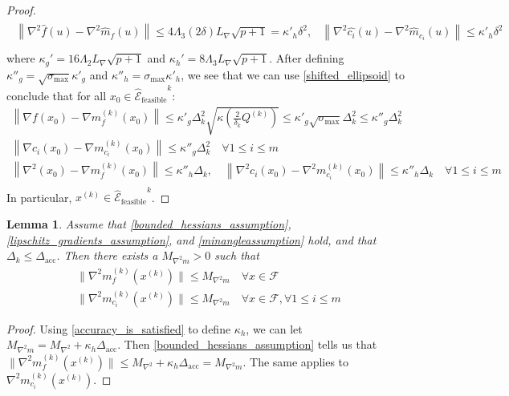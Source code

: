 \documentclass{article}
\newtheorem{lemma}[theorem]{Lemma}
\theoremstyle{case}
\newcommand{\lipgrad}{{L_{\nabla}}}
\newcommand{\maxhessian}{{M_{\nabla^2}}}
\newcommand{\maxmodelhessian}{{M_{\nabla^2 m}}}
\newcommand{\dacc}{{\Delta_{\text{acc}}}}
\newcommand{\xk}{{x^{(k)}}}
\newcommand{\dk}{\Delta_k}
\newcommand{\sdk}{{\delta_k}}
\newcommand{\feasible}{{\mathcal F}}
\newcommand{\hk}{{\nabla^2m_f^{(k)}(x^{(k)})}}
\newcommand{\gradf}{\nabla f}
\newcommand{\scaledunshiftedellipsoid}{{{\mathcal {\hat E}_{\text{feasible}}}^k}}
\newcommand{\sigmamax}{{\sigma_{\text{max}}}}
\begin{document}
\begin{proof}
\begin{align*}
\begin{array}{cc}
\left\|\nabla^2 \hat {f}\left(u\right) - \nabla^2 \hat{m}_f\left(u\right) \right\|\le 4 \Lambda_3 \left(2\delta\right) \lipgrad \sqrt{p+1} = {\kappa'}_h\delta^2, &
\left\|\nabla^2 \hat {c_i}\left(u\right) - \nabla^2 \hat{m}_{c_i}\left(u\right) \right\|\le {\kappa'}_h\delta^2 \\
\end{array}
\end{align*}
where $\kappa_{g}' = 16 \Lambda_2 \lipgrad \sqrt{p+1}$ and $\kappa_{h}' = 8 \Lambda_3 \lipgrad\sqrt{p+1}$.
After defining $\kappa''_{g} =  \sqrt{\sigmamax}\kappa'_g$ and $\kappa''_h = \sigmamax\kappa'_h$, we see that
we can use  \cref{shifted_ellipsoid} to conclude that for all $x_0 \in \scaledunshiftedellipsoid$:
\begin{align*}
\left\|\gradf\left(x_0 \right) - \nabla m^{(k)}_f\left(x_0\right)\right\| \le 
\kappa'_g  \dk^2 \sqrt{\kappa\left(\frac 2 {\sdk} Q^{(k)}\right)} \le \kappa'_g \sqrt{\sigmamax}\dk^2 \le \kappa''_g\dk^2 \\
\left\|\nabla {c_i}\left(x_0 \right) - \nabla m^{(k)}_{c_i}\left(x_0\right)\right\| \le \kappa''_g\dk^2 \quad \forall 1 \le i \le m \\
\left\|\nabla^2\left(x_0 \right) - \nabla m^{(k)}_f\left(x_0\right)\right\| \le \kappa''_h\dk, \quad
\left\|\nabla^2 {c_i}\left(x_0 \right) - \nabla^2 m^{(k)}_{c_i}\left(x_0\right)\right\| \le \kappa''_h\dk \quad \forall 1 \le i \le m \\
\end{align*}
In particular, $\xk \in \scaledunshiftedellipsoid$.
\end{proof}



\begin{lemma}
\label{bounded_model_hessian_lemma}
Assume that \cref{bounded_hessians_assumption}, \cref{lipschitz_gradients_assumption}, and \cref{minangleassumption} hold, and that $\dk \le \dacc$.
Then there exists a $\maxmodelhessian > 0$ such that 
\begin{align*}
\| \hk \| \le \maxmodelhessian \quad \forall x \in \feasible \\
\|\nabla^2 m_{c_i}^{(k)}(\xk) \| \le \maxmodelhessian \quad \forall x \in \feasible, \forall 1 \le i \le m
\end{align*}
\end{lemma}

\begin{proof}
Using \cref{accuracy_is_satisfied} to define $\kappa_h$, we can let $\maxmodelhessian = \maxhessian + \kappa_h \dacc$.
Then \cref{bounded_hessians_assumption} tells us that $\|\hk\| \le \maxhessian + \kappa_h\dacc = \maxmodelhessian$.
The same applies to $\nabla^2 m_{c_i}^{(k)}(\xk)$.
\end{proof}
\end{document}
